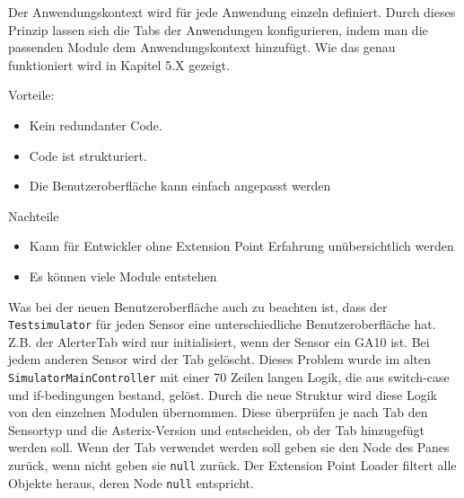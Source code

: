Der Anwendungskontext wird für jede Anwendung einzeln definiert. Durch dieses Prinzip lassen sich die Tabs der Anwendungen konfigurieren, indem man die passenden Module dem Anwendungskontext hinzufügt. Wie das genau funktioniert wird in Kapitel 5.X gezeigt.

Vorteile:
\begin{itemize}
    \item Kein redundanter Code.
    \item Code ist strukturiert.
    \item Die Benutzeroberfläche kann einfach angepasst werden
\end{itemize}

Nachteile
\begin{itemize}
    \item Kann für Entwickler ohne Extension Point Erfahrung unübersichtlich werden
    \item Es können viele Module entstehen    
\end{itemize}

Was bei der neuen Benutzeroberfläche auch zu beachten ist, dass der \texttt{Testsimulator} für jeden Sensor eine unterschiedliche Benutzeroberfläche hat. Z.B. der AlerterTab wird nur initialisiert, wenn der Sensor ein GA10 ist. Bei jedem anderen Sensor wird der Tab gelöscht. Dieses Problem wurde im alten \texttt{SimulatorMainController} mit einer 70 Zeilen langen Logik, die aus switch-case und if-bedingungen bestand, gelöst. Durch die neue Struktur wird diese Logik von den einzelnen Modulen übernommen. Diese überprüfen je nach Tab den Sensortyp und die Asterix-Version und entscheiden, ob der Tab hinzugefügt werden soll. Wenn der Tab verwendet werden soll geben sie den Node des Panes zurück, wenn nicht geben sie \texttt{null} zurück. Der Extension Point Loader filtert alle Objekte heraus, deren Node \texttt{null} entspricht.

